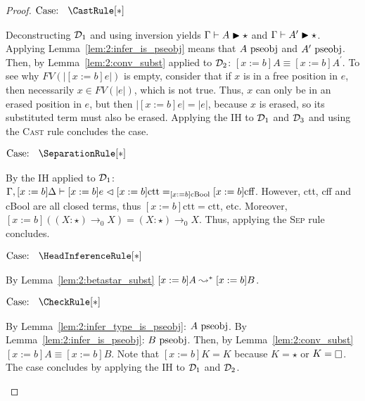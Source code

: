 \begin{proof}
    $\text{Case: }\begin{array}{c} \CastRule[*] \end{array}$
    \begin{proofcase}
        Deconstructing $\mathcal{D}_{1}$ and using inversion yields $\Gamma \vdash A \blacktriangleright \star$ and $\Gamma \vdash A^\prime \blacktriangleright \star$.
        Applying Lemma~\ref{lem:2:infer_is_pseobj} means that $A~\mbox{\normalfont pseobj}$ and $A^\prime~\mbox{\normalfont pseobj}$.
        Then, by Lemma~\ref{lem:2:conv_subst} applied to $\mathcal{D}_{2}$: $[x := b]A \equiv [x := b]A^\prime$.
        To see why $FV(|[x := b]e|)$ is empty, consider that if $x$ is in a free position in $e$, then necessarily $x \in FV(|e|)$, which is not true.
        Thus, $x$ can only be in an erased position in $e$, but then $|[x := b]e| = |e|$, because $x$ is erased, so its substituted term must also be erased.
        Applying the IH to $\mathcal{D}_{1}$ and $\mathcal{D}_{3}$ and using the \textsc{Cast} rule concludes the case.
    \end{proofcase}

    $\text{Case: }\begin{array}{c} \SeparationRule[*] \end{array}$
    \begin{proofcase}
        By the IH applied to $\mathcal{D}_{1}$: $\Gamma, [x := b]\Delta \vdash [x := b]e \vartriangleleft [x := b]\text{ctt} =_{[x := b]\text{cBool}} [x := b]\text{cff}$.
        However, ctt, cff and cBool are all closed terms, thus $[x := b]\text{ctt} = \text{ctt}$, etc.
        Moreover, $[x := b]((X : \star) \to_0 X) = (X : \star) \to_0 X$.
        Thus, applying the \textsc{Sep} rule concludes.
    \end{proofcase}

    $\text{Case: }\begin{array}{c} \HeadInferenceRule[*] \end{array}$
    \begin{proofcase}
        By Lemma~\ref{lem:2:betastar_subst} $[x := b]A \leadsto^* [x := b]B$.
    \end{proofcase}

    $\text{Case: }\begin{array}{c} \CheckRule[*] \end{array}$
    \begin{proofcase}
        By Lemma~\ref{lem:2:infer_type_is_pseobj}: $A~\mbox{\normalfont pseobj}$.
        By Lemma~\ref{lem:2:infer_is_pseobj}: $B~\mbox{\normalfont pseobj}$.
        Then, by Lemma~\ref{lem:2:conv_subst} $[x := b]A \equiv [x := b]B$.
        Note that $[x := b]K = K$ because $K = \star$ or $K = \kind$.
        The case concludes by applying the IH to $\mathcal{D}_{1}$ and $\mathcal{D}_{2}$.
    \end{proofcase}


\end{proof}
